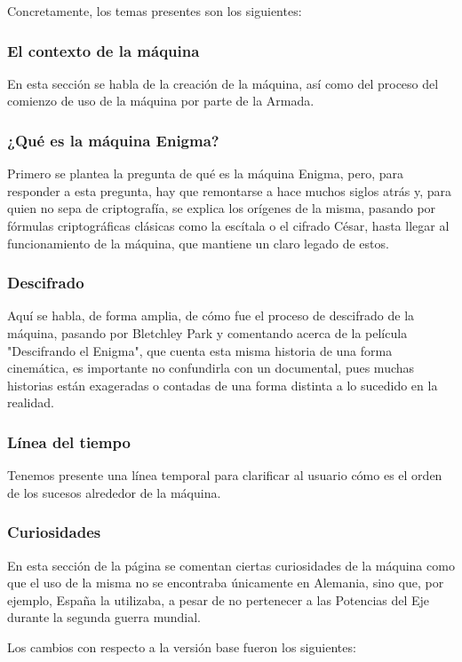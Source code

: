 Concretamente, los temas presentes son los siguientes:

\subsubsection{El contexto de la máquina}
En esta sección se habla de la creación de la máquina, así como del proceso del comienzo de uso de la máquina por parte de la Armada.

\subsubsection{¿Qué es la máquina Enigma?}
Primero se plantea la pregunta de qué es la máquina Enigma, pero, para responder a esta pregunta, hay que remontarse a hace muchos siglos atrás y, para quien no sepa de criptografía, se explica los orígenes de la misma, pasando por fórmulas criptográficas clásicas como la escítala o el cifrado César, hasta llegar al funcionamiento de la máquina, que mantiene un claro legado de estos.

\subsubsection{Descifrado}
Aquí se habla, de forma amplia, de cómo fue el proceso de descifrado de la máquina, pasando por Bletchley Park y comentando acerca de la película "Descifrando el Enigma", que cuenta esta misma historia de una forma cinemática, es importante no confundirla con un documental, pues muchas historias están exageradas o contadas de una forma distinta a lo sucedido en la realidad.

\subsubsection{Línea del tiempo}
Tenemos presente una línea temporal para clarificar al usuario cómo es el orden de los sucesos alrededor de la máquina.

\subsubsection{Curiosidades}
En esta sección de la página se comentan ciertas curiosidades de la máquina como que el uso de la misma no se encontraba únicamente en Alemania, sino que, por ejemplo, España la utilizaba, a pesar de no pertenecer a las Potencias del Eje durante la segunda guerra mundial.

Los cambios con respecto a la versión base fueron los siguientes:

